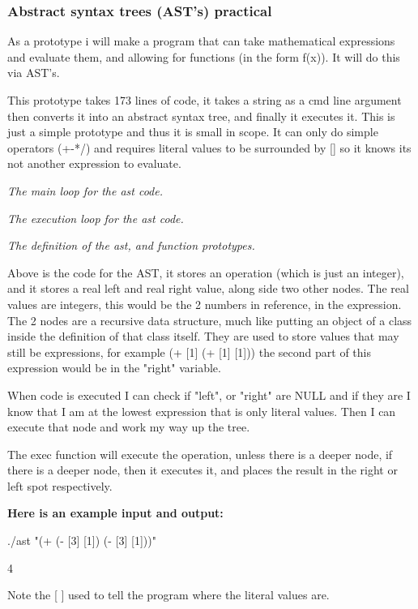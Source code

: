 \documentclass[a4paper,12pt]{article}
\begin{document}
{\subsubsection{Abstract syntax trees (AST's) practical}
As a prototype i will make a program that can take mathematical expressions and evaluate 
them, and allowing for functions (in the form f(x)). It will do this via AST's.

This prototype takes 173 lines of code, it takes a string as a cmd line argument then 
converts it into an abstract syntax tree, and finally it executes it. This is just a
simple prototype and thus it is small in scope. It can only do simple operators (+-*/) 
and requires literal values to be surrounded by [] so it knows its not another 
expression to evaluate.


\textit{The main loop for the ast code.}


\textit{The execution loop for the ast code.}


\textit{The definition of the ast, and function prototypes.}

Above is the code for the AST, it stores an operation (which is just an integer), and 
it stores a real left and real right value, along side two other nodes. The real values
are integers, this would be the 2 numbers in reference, in the expression. The 2 nodes are a
recursive data structure, much like putting an object of a class inside the definition of that class
itself. They are used to store values that may still be expressions, for example 
(+ [1] (+ [1] [1])) the second part of this expression would be in the "right" 
variable. 

When code is executed I can check if "left", or "right" are NULL and if 
they are I know that I am at the lowest expression that is only literal values.
Then I can execute that node and work my way up the tree.

The exec function will execute the operation, unless there is a deeper node, if there is 
a deeper node, then it executes it, and places the result in the right or left spot 
respectively.

\textbf{Here is an example input and output:}

 ./ast "(+ (- [3] [1]) (- [3] [1]))"

4

{\small Note the [ ] used to tell the program where the literal values are.}

}
\end{document}
